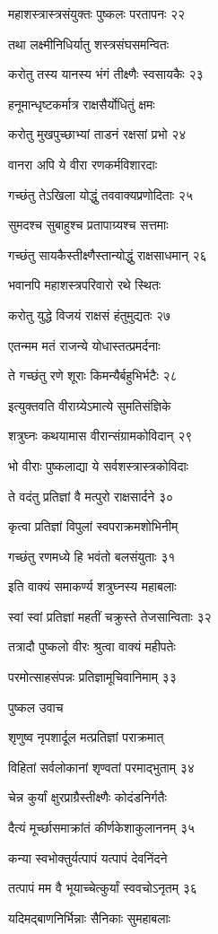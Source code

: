 महाशस्त्रास्त्रसंयुक्तः पुष्कलः परतापनः २२

तथा लक्ष्मीनिधिर्यातु शस्त्रसंघसमन्वितः

करोतु तस्य यानस्य भंगं तीक्ष्णैः स्वसायकैः २३

हनूमान्धृष्टकर्मात्र राक्षसैर्योधितुं क्षमः

करोतु मुखपुच्छाभ्यां ताडनं रक्षसां प्रभो २४

वानरा अपि ये वीरा रणकर्मविशारदाः

गच्छंतु तेऽखिला योद्धुं तववाक्यप्रणोदिताः २५

सुमदश्च सुबाहुश्च प्रतापाग्र्यश्च सत्तमाः

गच्छंतु सायकैस्तीक्ष्णैस्तान्योद्धुं राक्षसाधमान् २६

भवानपि महाशस्त्रपरिवारो रथे स्थितः

करोतु युद्धे विजयं राक्षसं हंतुमुद्यतः २७

एतन्मम मतं राजन्ये योधास्तत्प्रमर्दनाः

ते गच्छंतु रणे शूराः किमन्यैर्बहुभिर्भटैः २८

इत्युक्तवति वीराग्र्येऽमात्ये सुमतिसंज्ञिके

शत्रुघ्नः कथयामास वीरान्संग्रामकोविदान् २९

भो वीराः पुष्कलाद्या ये सर्वशस्त्रास्त्रकोविदाः

ते वदंतु प्रतिज्ञां वै मत्पुरो राक्षसार्दने ३०

कृत्वा प्रतिज्ञां विपुलां स्वपराक्रमशोभिनीम्

गच्छंतु रणमध्ये हि भवंतो बलसंयुताः ३१

इति वाक्यं समाकर्ण्य शत्रुघ्नस्य महाबलाः

स्वां स्वां प्रतिज्ञां महतीं चक्रुस्ते तेजसान्विताः ३२

तत्रादौ पुष्कलो वीरः श्रुत्वा वाक्यं महीपतेः

परमोत्साहसंपन्नः प्रतिज्ञामूचिवानिमाम् ३३

पुष्कल उवाच

शृणुष्व नृपशार्दूल मत्प्रतिज्ञां पराक्रमात्

विहितां सर्वलोकानां शृण्वतां परमाद्भुताम् ३४

चेन्न कुर्यां क्षुरप्राग्रैस्तीक्ष्णैः कोदंडनिर्गतैः

दैत्यं मूर्च्छासमाक्रांतं कीर्णकेशाकुलाननम् ३५

कन्या स्वभोक्तुर्यत्पापं यत्पापं देवनिंदने

तत्पापं मम वै भूयाच्चेत्कुर्यां स्ववचोऽनृतम् ३६

यदिमद्बाणनिर्भिन्नाः सैनिकाः सुमहाबलाः

